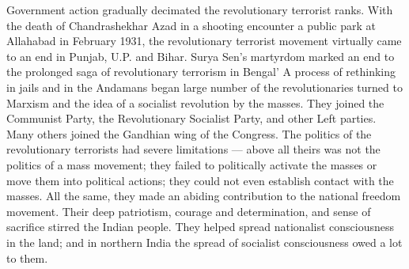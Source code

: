 Government action gradually decimated the revolutionary terrorist ranks. With the death of Chandrashekhar Azad in a shooting encounter a public park at Allahabad in February 1931, the revolutionary terrorist movement virtually came to an end in Punjab, U.P. and Bihar. Surya Sen's martyrdom marked an end to the prolonged saga of revolutionary terrorism in Bengal' A process of rethinking in jails and in the Andamans began large number of the revolutionaries turned to Marxism and the idea of a socialist revolution by the masses. They joined the Communist Party, the Revolutionary Socialist Party, and other Left parties. Many others joined the Gandhian wing of the Congress. The politics of the revolutionary terrorists had severe limitations --- above all theirs was not the politics of a mass movement; they failed to politically activate the masses or move them into political actions; they could not even establish contact with the masses. All the same, they made an abiding contribution to the national freedom movement. Their deep patriotism, courage and determination, and sense of sacrifice stirred the Indian people. They helped spread nationalist consciousness in the land; and in northern India the spread of socialist consciousness owed a lot to them.
